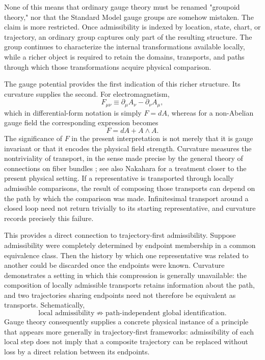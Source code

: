 \documentclass[11pt]{article}
\begin{document}
None of this means that ordinary gauge theory must be renamed "groupoid theory," nor that the Standard Model gauge groups are somehow mistaken. The claim is more restricted. Once admissibility is indexed by location, state, chart, or trajectory, an ordinary group captures only part of the resulting structure. The group continues to characterize the internal transformations available locally, while a richer object is required to retain the domains, transports, and paths through which those transformations acquire physical comparison.

The gauge potential provides the first indication of this richer structure. Its curvature supplies the second. For electromagnetism,
\[
F_{\mu\nu} \equiv \partial_\mu A_\nu - \partial_\nu A_\mu,
\]
which in differential-form notation is simply $F = dA$, whereas for a non-Abelian gauge field the corresponding expression becomes
\[
F = dA + A \wedge A.
\]
The significance of $F$ in the present interpretation is not merely that it is gauge invariant or that it encodes the physical field strength. Curvature measures the nontriviality of transport, in the sense made precise by the general theory of connections on fiber bundles \cite{Ehresmann1950,KobayashiNomizu1963}; see also Nakahara \cite{Nakahara2003} for a treatment closer to the present physical setting. If a representative is transported through locally admissible comparisons, the result of composing those transports can depend on the path by which the comparison was made. Infinitesimal transport around a closed loop need not return trivially to its starting representative, and curvature records precisely this failure.

This provides a direct connection to trajectory-first admissibility. Suppose admissibility were completely determined by endpoint membership in a common equivalence class. Then the history by which one representative was related to another could be discarded once the endpoints were known. Curvature demonstrates a setting in which this compression is generally unavailable: the composition of locally admissible transports retains information about the path, and two trajectories sharing endpoints need not therefore be equivalent as transports. Schematically,
\[
\text{local admissibility} \not\Rightarrow \text{path-independent global identification}.
\]
Gauge theory consequently supplies a concrete physical instance of a principle that appears more generally in trajectory-first frameworks: admissibility of each local step does not imply that a composite trajectory can be replaced without loss by a direct relation between its endpoints.
\end{document}

